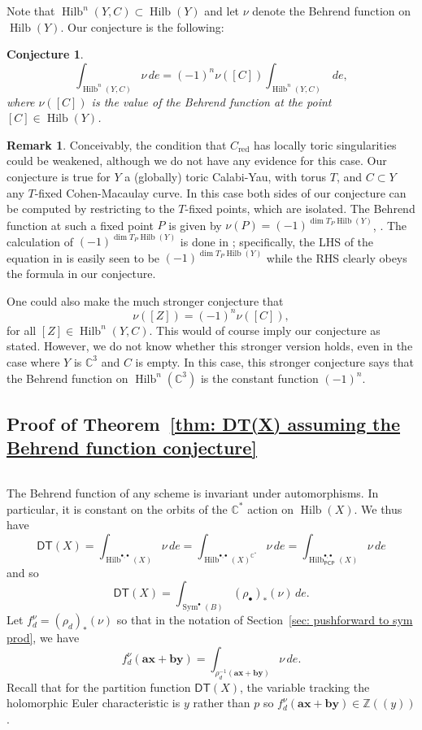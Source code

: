 \documentclass[12pt]{amsart}
\newtheorem{conjecture}[theorem]{Conjecture}
\theoremstyle{definition}
\newtheorem{remark}[theorem]{Remark}
\newcommand{\CC} {\mathbb{C}}          %
\newcommand{\ZZ} {\mathbb{Z}}		%
\newcommand{\Sym}{\operatorname{Sym}}
\newcommand{\Hilb}{\operatorname{Hilb}}
\newcommand{\DT}{\mathsf{DT}}
\newcommand{\boldx}{\boldsymbol{x}}
\newcommand{\boldy}{\boldsymbol{y}}
\newcommand{\bolda}{\boldsymbol{a}}
\newcommand{\boldb}{\boldsymbol{b}}
\newcommand{\PCP}{\mathsf{PCP}}
\newcommand{\red}{\mathrm{red}}
\newcommand{\SubSecSpace}{$\,$\vspace{0.2cm}\par } %
\begin{document}
Note that $\Hilb^{n}(Y,C)\subset \Hilb (Y)$ and let $\nu$ denote the
Behrend function on $\Hilb (Y)$. Our conjecture is the following:

\begin{conjecture}\label{conj: Behrend fnc conj}
\[
\int_{\Hilb^{n}(Y,C)} \nu \, de = (-1)^{n} \nu ([C]) \int_{\Hilb^{n}(Y,C)} \, de,
\]
where $\nu ([C])$ is the value of the Behrend function at the point $[C]\in \Hilb (Y)$.
\end{conjecture}

\begin{remark}
Conceivably, the condition that $C_{\red}$ has locally toric
singularities could be weakened, although we do not have any evidence
for this case. Our conjecture is true for $Y$ a (globally) toric
Calabi-Yau, with torus $T$, and $C \subset Y$ any $T$-fixed
Cohen-Macaulay curve. In this case both sides of our conjecture can be
computed by restricting to the $T$-fixed points, which are
isolated. The Behrend function at such a fixed point $P$ is given by $\nu(P) =
(-1)^{\dim T_P\Hilb (Y)}$, \cite[Thm.~3.4]{Behrend-Fantechi08}. The
calculation of $(-1)^{\dim T_{P}\Hilb (Y)}$ is done in \cite{MNOP1};
specifically, the LHS of the equation in \cite[Thm~2]{MNOP1} is easily
seen to be $(-1)^{\dim T_{P}\Hilb (Y)}$ while the RHS clearly obeys the
formula in our conjecture.

One could also make the much stronger conjecture that 
\[
\nu ([Z]) = (-1)^{n} \nu ([C]),
\]
for all $[Z]\in \Hilb^{n}(Y,C)$. This would of course imply our
conjecture as stated. However, we do not know whether this stronger version
holds, even in the case where $Y$ is $\CC^{3}$ and $C$ is empty. In
this case, this stronger conjecture says that the Behrend function
on $\Hilb^{n}(\CC^{3})$ is the constant function $(-1)^{n}$.
\end{remark}


\subsection{Proof of Theorem~\ref{thm: DT(X) assuming the Behrend
function conjecture}}\SubSecSpace 

The Behrend function of any scheme is invariant under
automorphisms. In particular, it is constant on the orbits of the
$\CC^{*}$ action on $\Hilb (X)$. We thus have
\[
\DT (X) = \int_{\Hilb^{\bullet ,\bullet}(X)} \nu \, de =
\int_{\Hilb^{\bullet ,\bullet}(X)^{\CC^{*}}} \nu \, de =
\int_{\Hilb_{\PCP }^{\bullet ,\bullet}(X)} \nu \, de
\]
and so
\[
\DT (X)  =\int_{\Sym^{\bullet}(B)} (\rho_{\bullet})_{*} (\nu )\, de.
\]
Let $f^{\nu}_{d} = (\rho_{d})_{*}(\nu )$ so that in the notation of
Section~\ref{sec: pushforward to sym prod}, we have
\[
f^{\nu}_{d}(\bolda \boldx +\boldb \boldy ) =
\int_{\rho^{-1}_{d}(\bolda \boldx +\boldb \boldy )} \nu \, de.
\]
Recall that for the partition function $\DT (X)$, the variable
tracking the holomorphic Euler characteristic is $y$ rather than $p$
so $f_{d}^{\nu}(\bolda \boldx +\boldb \boldy )\in \ZZ (\!(y)\!)$.
\end{document}
